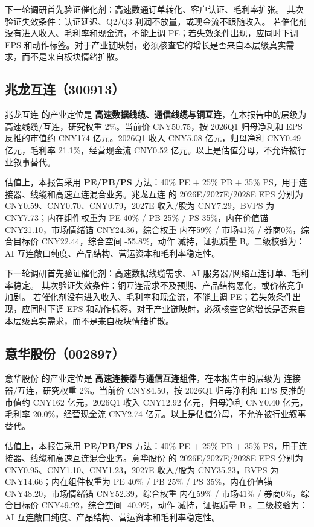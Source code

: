 下一轮调研首先验证催化剂：高速数通订单转化、客户认证、毛利率扩张。 其次验证失效条件：认证延迟、Q2/Q3 利润不放量，或现金流不跟随收入。 若催化剂没有进入收入、毛利率和现金流，不能上调 PE；若失效条件出现，应同时下调 EPS 和动作标签。对于产业链映射，必须核查它的增长是否来自本层级真实需求，而不是来自板块情绪扩散。


\subsection{兆龙互连（300913）}
兆龙互连 的产业定位是 \textbf{高速数据线缆、通信线缆与铜互连}，在本报告中的层级为 高速线缆/互连，研究权重 2\%。当前价 CNY50.75，按 2026Q1 归母净利和 EPS 反推的市值约 CNY174 亿元。2026Q1 收入 CNY5.08 亿元，归母净利 CNY0.49 亿元，毛利率 21.1\%，经营现金流 CNY0.52 亿元。以上是估值分母，不允许被行业叙事替代。

估值上，本报告采用 \textbf{PE/PB/PS} 方法：40\% PE + 25\% PB + 35\% PS，用于连接器、线缆和高速互连混合业务。兆龙互连 的 2026E/2027E/2028E EPS 分别为 CNY0.59、CNY0.70、CNY0.79，2027E 收入/股为 CNY7.29，BVPS 为 CNY7.73；内在组件权重为 PE 40\% / PB 25\% / PS 35\%，内在价值锚 CNY21.10，市场情绪锚 CNY24.36，综合权重 内在59\% / 市场41\% / 券商0\%，综合目标价 CNY22.44，综合空间 -55.8\%，动作 减持，证据质量 B。二级校验为：AI 互连敞口纯度、产品结构、营运资本和毛利率稳定性。

下一轮调研首先验证催化剂：高速数据线缆需求、AI 服务器/网络互连订单、毛利率稳定。 其次验证失效条件：铜互连需求不及预期、产品结构恶化，或价格竞争加剧。 若催化剂没有进入收入、毛利率和现金流，不能上调 PE；若失效条件出现，应同时下调 EPS 和动作标签。对于产业链映射，必须核查它的增长是否来自本层级真实需求，而不是来自板块情绪扩散。


\subsection{意华股份（002897）}
意华股份 的产业定位是 \textbf{高速连接器与通信互连组件}，在本报告中的层级为 连接器/互连，研究权重 2\%。当前价 CNY84.50，按 2026Q1 归母净利和 EPS 反推的市值约 CNY162 亿元。2026Q1 收入 CNY12.92 亿元，归母净利 CNY0.40 亿元，毛利率 20.0\%，经营现金流 CNY2.74 亿元。以上是估值分母，不允许被行业叙事替代。

估值上，本报告采用 \textbf{PE/PB/PS} 方法：40\% PE + 25\% PB + 35\% PS，用于连接器、线缆和高速互连混合业务。意华股份 的 2026E/2027E/2028E EPS 分别为 CNY0.95、CNY1.10、CNY1.23，2027E 收入/股为 CNY35.23，BVPS 为 CNY14.66；内在组件权重为 PE 40\% / PB 25\% / PS 35\%，内在价值锚 CNY48.20，市场情绪锚 CNY52.39，综合权重 内在59\% / 市场41\% / 券商0\%，综合目标价 CNY49.92，综合空间 -40.9\%，动作 减持，证据质量 B-。二级校验为：AI 互连敞口纯度、产品结构、营运资本和毛利率稳定性。

